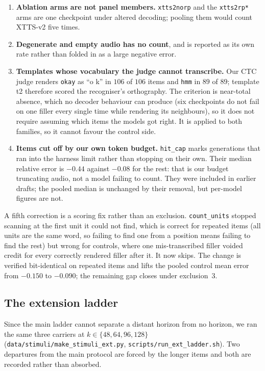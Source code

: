 \documentclass[11pt]{article}
\begin{document}
\begin{enumerate}
\item \textbf{Ablation arms are not panel members.} \texttt{xtts2norp} and the
\texttt{xtts2rp*} arms are one checkpoint under altered decoding; pooling them
would count XTTS-v2 five times.
\item \textbf{Degenerate and empty audio has no count}, and is reported as its
own rate rather than folded in as a large negative error.
\item \textbf{Templates whose vocabulary the judge cannot transcribe.} Our CTC
judge renders \texttt{okay} as ``o k'' in $106$ of $106$ items and \texttt{hmm}
in $89$ of $89$; template t2 therefore scored the recogniser's orthography.
The criterion is near-total absence, which no decoder behaviour can produce
(six checkpoints do not fail on one filler every single time while rendering its
neighbours), so it does not require assuming which items the models got right.
It is applied to both families, so it cannot favour the control side.
\item \textbf{Items cut off by our own token budget.} \texttt{hit\_cap} marks
generations that ran into the harness limit rather than stopping on their own.
Their median relative error is $-0.44$ against $-0.08$ for the rest: that is our
budget truncating audio, not a model failing to count. They were included in
earlier drafts; the pooled median is unchanged by their removal, but per-model
figures are not.
\end{enumerate}

A fifth correction is a scoring fix rather than an exclusion. \texttt{count\_units}
stopped scanning at the first unit it could not find, which is correct for
repeated items (all units are the same word, so failing to find one from a
position means failing to find the rest) but wrong for controls, where one
mis-transcribed filler voided credit for every correctly rendered filler after
it. It now skips. The change is verified bit-identical on repeated items and
lifts the pooled control mean error from $-0.150$ to $-0.090$; the remaining gap
closes under exclusion~3.


\subsection{The extension ladder}
\label{sec:s10-ext}

Since the main ladder cannot separate a distant horizon from no horizon, we ran
the same three carriers at $k \in \{48, 64, 96, 128\}$
(\texttt{data/stimuli/make\_stimuli\_ext.py},
\texttt{scripts/run\_ext\_ladder.sh}). Two departures from the main protocol are
forced by the longer items and both are recorded rather than absorbed.
\end{document}
